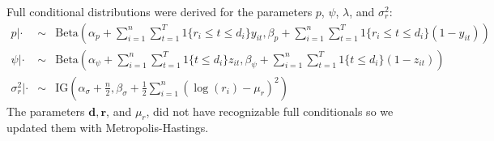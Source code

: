 \documentclass[12pt, a4paper]{article}
\begin{document}
Full conditional distributions were derived for the parameters $p$, $\psi$, $\lambda$, and $\sigma_r^2$:
\begin{eqnarray*}
p | \cdot & \sim & \text{Beta} \left( \alpha_p + \sum_{i=1}^n \sum_{t=1}^T 1 \{ r_i \leq t \leq d_i \} y_{it}, \beta_p + \sum_{i=1}^n \sum_{t=1}^T 1\{ r_i \leq t \leq d_i \} (1 - y_{it}) \right)  \\
\psi | \cdot & \sim & \text{Beta}\left( \alpha_{\psi} + \sum_{i=1}^n \sum_{t=1}^T 1\{ t \leq d_i\} z_{it}, \beta_{\psi} + \sum_{i=1}^n \sum_{t=1}^T 1\{ t \leq d_i \} (1 - z_{it}) \right) \\
\sigma_{r}^2 | \cdot & \sim & \text{IG} \left( \alpha_{\sigma} + \frac{n}{2}, \beta_{\sigma} + \frac{1}{2} \sum_{i=1}^n ( \log(r_i) - \mu_r)^2 \right)
\end{eqnarray*}
The parameters $\mathbf{d}, \mathbf{r}$, and $\mu_r$, did not have recognizable full conditionals so we updated them with Metropolis-Hastings.

% 
% 
% 
% 
% 
% 


\end{document}
